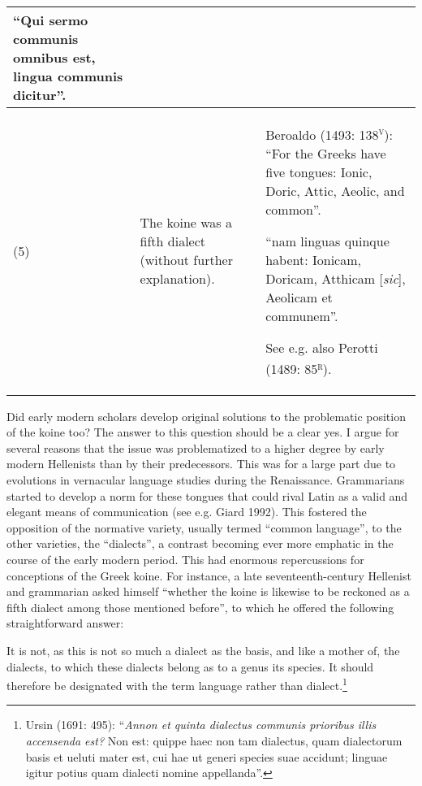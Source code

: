 \documentclass[12pt]{article}
\newenvironment{styleStandard}{\renewcommand\baselinestretch{1.25}\setlength\leftskip{0in}\setlength\rightskip{0in}\setlength\parindent{0.1972in}\setlength\parfillskip{0pt plus 1fil}\setlength\parskip{0in plus 1pt}\writerlistparindent\writerlistleftskip\leavevmode\normalfont\normalsize\writerlistlabel\ignorespaces}{\unskip\vspace{0in plus 1pt}\par}
\newenvironment{styleQuote}{\renewcommand\baselinestretch{1.25}\setlength\leftskip{0.3937in}\setlength\rightskip{0in}\setlength\parindent{0in}\setlength\parfillskip{0pt plus 1fil}\setlength\parskip{0.1665in plus 0.016649999in}\writerlistparindent\writerlistleftskip\leavevmode\normalfont\normalsize\writerlistlabel\ignorespaces}{\unskip\vspace{0.1665in plus 0.016649999in}\par}
\newcommand\writerlistleftskip{}
\newcommand\writerlistparindent{}
\newcommand\writerlistlabel{}
\begin{document}
\begin{flushleft}
\begin{supertabular}{|m{0.27685985in}|m{1.8261598in}|m{3.9538598in}|}
“Qui sermo communis omnibus est, lingua communis dicitur”.\\\hline
\centering (5) &
\centering The koine was a fifth dialect (without further explanation). &
Beroaldo (1493: 138\textsc{\textsuperscript{v}}): “For the Greeks have five tongues: Ionic, Doric, Attic, Aeolic, and common”.

“nam linguas quinque habent: Ionicam, Doricam, Atthicam [\textit{sic}], Aeolicam et communem”.

See e.g. also Perotti (1489: 85\textsc{\textsuperscript{r}}).\\\hline
\end{supertabular}
\end{flushleft}
\begin{styleStandard}
Did early modern scholars develop original solutions to the problematic position of the koine too? The answer to this question should be a clear yes. I argue for several reasons that the issue was problematized to a higher degree by early modern Hellenists than by their predecessors. This was for a large part due to evolutions in vernacular language studies during the Renaissance. Grammarians started to develop a norm for these tongues that could rival Latin as a valid and elegant means of communication (see e.g. Giard 1992). This fostered the opposition of the normative variety, usually termed “common language”, to the other varieties, the “dialects”, a contrast becoming ever more emphatic in the course of the early modern period. This had enormous repercussions for conceptions of the Greek koine. For instance, a late seventeenth-century Hellenist and grammarian asked himself “whether the koine is likewise to be reckoned as a fifth dialect among those mentioned before”, to which he offered the following straightforward answer:
\end{styleStandard}

\begin{styleQuote}
It is not, as this is not so much a dialect as the basis, and like a mother of, the dialects, to which these dialects belong as to a genus its species. It should therefore be designated with the term language rather than dialect.\footnote{ Ursin (1691: 495): “\textit{Annon et quinta dialectus communis prioribus illis accensenda est?} Non est: quippe haec non tam dialectus, quam dialectorum basis et ueluti mater est, cui hae ut generi species suae accidunt; linguae igitur potius quam dialecti nomine appellanda”.}
\end{styleQuote}
\end{document}
